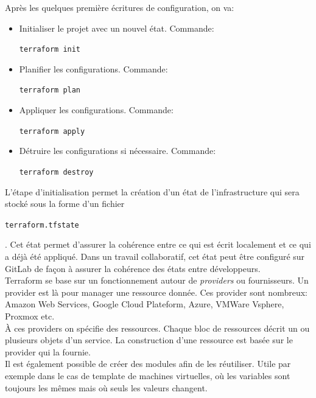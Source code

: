 \documentclass[12pt, a4paper, twoside]{article}
\begin{document}
Après les quelques première écritures de configuration, on va:
\begin{itemize}
    \item Initialiser le projet avec un nouvel état. Commande: \begin{code}\texttt{terraform init}\end{code}
    \item Planifier les configurations. Commande: \begin{code}\texttt{terraform plan}\end{code}
    \item Appliquer les configurations. Commande: \begin{code}\texttt{terraform apply}\end{code}
    \item Détruire les configurations si nécessaire. Commande: \begin{code}\texttt{terraform destroy}\end{code}
\end{itemize}

L'étape d'initialisation permet la création d'un état de l'infrastructure qui sera stocké sous la forme d'un fichier \begin{code}\texttt{terraform.tfstate}\end{code}. 
Cet état permet d'assurer la cohérence entre ce qui est écrit localement et ce qui a déjà été appliqué. 
Dans un travail collaboratif, cet état peut être configuré sur \gls{GitLab} de façon à assurer la cohérence des états entre développeurs. \\

\gls{Terraform} se base sur un fonctionnement autour de \textit{providers} ou fournisseurs. 
Un provider est là pour manager une ressource donnée. 
Ces provider sont nombreux: Amazon Web Services, Google Cloud Plateform, Azure, VMWare Vsphere, \gls{Proxmox} etc.\\

À ces providers on spécifie des ressources. 
Chaque bloc de ressources décrit un ou plusieurs objets d'un service. 
La construction d'une ressource est basée sur le provider qui la fournie.\\

Il est également possible de créer des modules afin de les réutiliser. 
Utile par exemple dans le cas de template de machines virtuelles, où les variables sont toujours les mêmes mais où seuls les valeurs changent.

\newpage
\end{document}
